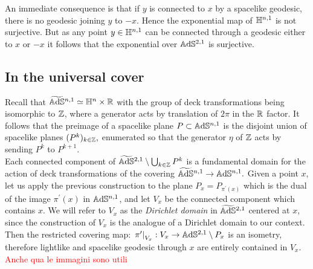 An immediate consequence is that if $y$ is connected to $x$ by a spacelike geodesic, there is no geodesic joining $y$ to $-x$. Hence the exponential map of $\mathbb{H}^{n,1}$ is not surjective. But as any point $y\in\mathbb{H}^{n,1}$ can be connected through a geodesic either to $x$ or $-x$ it follows that the exponential over $\mathbb{A}\mathrm{d}\mathbb{S}^{2,1}$ is surjective.
\subsection{In the universal cover}
Recall that $\widetilde{\mathbb{A}\mathrm{d}\mathbb{S}}{}^{n,1}\simeq \mathbb{H}^n\times\mathbb{R}$ with the group of deck transformations being isomorphic to $\mathbb{Z}$, where a generator acts by translation of $2\pi$ in the $\mathbb{R}$ factor. It follows that the preimage of a spacelike plane $P\subset\mathbb{A}\mathrm{d}\mathbb{S}^{n,1}$ is the disjoint union of spacelike planes $(P^k)_{k\in\mathbb{Z}},$ enumerated so that the generator $\eta$ of $\mathbb{Z}$ acts by sending $P^k$ to $P^{k+1}.$ \\
Each connected component of $\widetilde{\mathbb{A}\mathrm{d}\mathbb{S}}{}^{2,1}\setminus\bigcup_{k\in\mathbb{Z}} P^k$ is a fundamental domain for the action of deck transformations of the covering $\widetilde{\mathbb{A}\mathrm{d}\mathbb{S}}{}^{n,1}\to\mathbb{A}\mathrm{d}\mathbb{S}^{n,1}.$ Given a point $x$, let us apply the previous construction to the plane $P_x=P_{\pi^{\prime}(x)}$ which is the dual of the image $\pi^{\prime}(x)$ in $\mathbb{A}\mathrm{d}\mathbb{S}^{n,1}$, and let $V_x$ be the connected component which contains $x$. We will refer to $V_x$ as the \textit{Dirichlet domain} in $\widetilde{\mathbb{A}\mathrm{d}\mathbb{S}}{}^{2,1}$ centered at $x$, since the construction of $V_x$ is the analogue of a Dirichlet domain to our context. Then the restricted covering map: $\left.\pi^{\prime}\right|_{V_x}:V_x\to\mathbb{A}\mathrm{d}\mathbb{S}^{2,1}\setminus P_x$ is an isometry, therefore lightlike and spacelike geodesic through $x$ are entirely contained in $V_x$.\\ 

\textcolor{red}{Anche qua le immagini sono utili }